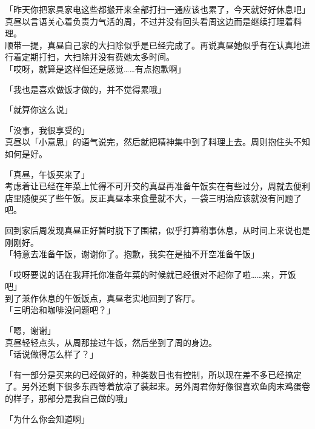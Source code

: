「昨天你把家具家电这些都搬开来全部打扫一通应该也累了，今天就好好休息吧」\\

真昼以言语关心着负责力气活的周，不过并没有回头看周这边而是继续打理着料理。\\

顺带一提，真昼自己家的大扫除似乎是已经完成了。再说真昼她似乎有在认真地进行着定期打扫，大扫除并没有费她太多时间。\\

「哎呀，就算是这样但还是感觉……有点抱歉啊」

「我也是喜欢做饭才做的，并不觉得累哦」

「就算你这么说」

「没事，我很享受的」\\

真昼以「小意思」的语气说完，然后就把精神集中到了料理上去。周则抱住头不知如何是好。\\

\vspace{2\baselineskip}

「真昼，午饭买来了」\\

考虑着让已经在年菜上忙得不可开交的真昼再准备午饭实在有些过分，周就去便利店里随便买了些午饭。反正真昼本来食量就不大，一袋三明治应该就没有问题了吧。

回到家后周发现真昼正好暂时脱下了围裙，似乎打算稍事休息，从时间上来说也是刚刚好。\\%

「特意去准备午饭，谢谢你了。抱歉，我实在是抽不开空准备午饭」

「哎呀要说的话在我拜托你准备年菜的时候就已经很对不起你了啦……来，开饭吧」\\

到了兼作休息的午饭饭点，真昼老实地回到了客厅。\\

「三明治和咖啡没问题吧？」

「嗯，谢谢」\\

真昼轻轻点头，从周那接过午饭，然后坐到了周的身边。\\

「话说做得怎么样了？」

「有一部分是买来的已经做好的，种类数目也有控制，所以现在差不多已经搞定了。另外还剩下很多东西等着放凉了装起来。另外周君你好像很喜欢鱼肉末鸡蛋卷的样子，那部分是我自己做的哦」%

「为什么你会知道啊」

